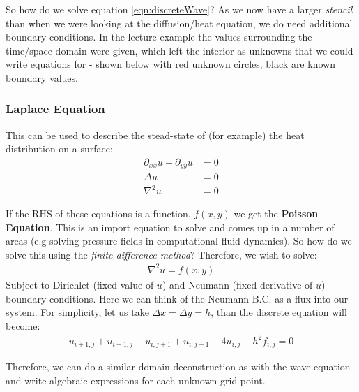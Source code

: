 \documentclass[11pt,a4paper]{report}
\begin{document}
				So how do we solve equation \ref{eqn:discreteWave}? As we now have a larger \textit{stencil} than when we were looking at the diffusion/heat equation, we do need additional boundary conditions. In the lecture example the values surrounding the time/space domain were given, which left the interior as unknowns that we could write equations for - shown below with red unknown circles, black are known boundary values.
				\begin{figure}[h!]
					\centering
			\end{figure}
			
			\subsubsection{Laplace Equation}
				This can be used to describe the stead-state of (for example) the heat distribution on a surface:
				\begin{align}
					\partial_{xx} u + \partial_{yy} u &= 0 \\
					\Delta u &= 0 \\
					\nabla^2 u &= 0 
				\end{align}
				
				If the RHS of these equations is a function, $f(x,y)$ we get the \textbf{Poisson Equation}. This is an import equation to solve and comes up in a number of areas (e.g solving pressure fields in computational fluid dynamics). So how do we solve this using the \textit{finite difference method}? Therefore, we wish to solve:
				\begin{align}
					\nabla^2 u = f(x,y)
				\end{align}
				Subject to Dirichlet (fixed value of $u$) and Neumann (fixed derivative of $u$) boundary conditions. Here we can think of the Neumann B.C. as a flux into our system. For simplicity, let us take $\Delta x = \Delta y = h$, than the discrete equation will become:
				\begin{align}
					u_{i+1,j} + u_{i-1,j} + u_{i,j+1} + u_{i,j-1} - 4u_{i,j} - h^2 f_{i,j} = 0
				\end{align}
				
				Therefore, we can do a similar domain deconstruction as with the wave equation and write algebraic expressions for each unknown grid point.
\end{document}
